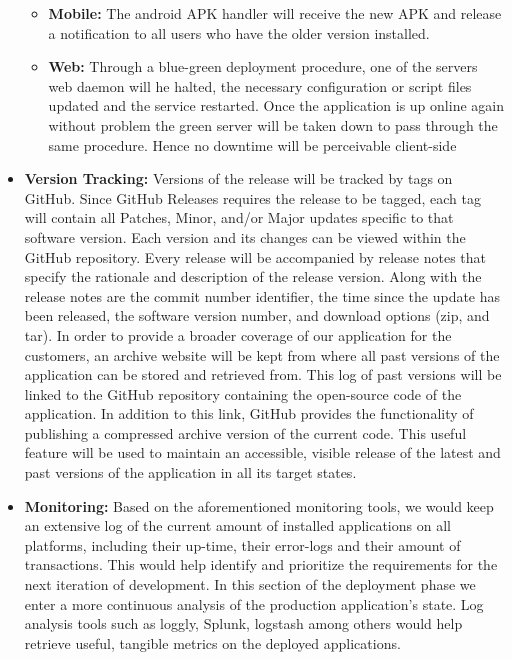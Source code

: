 \documentclass[12pt]{report}
\begin{document}
\begin{itemize}
\begin{itemize}
        \item \textbf{Mobile:} The android APK handler will receive the new APK and release a notification to all users who have the older version installed.
        \item \textbf{Web:} Through a blue-green deployment procedure, one of the servers web daemon will he halted, the necessary configuration or script files updated and the service restarted. Once the application is up online again without problem the green server will be taken down to pass through the same procedure. Hence no downtime will be perceivable client-side
    \end{itemize}
    \item \textbf{Version Tracking:} Versions of the release will be tracked by tags on GitHub.
    Since GitHub Releases requires the release to be tagged, each tag will contain all Patches, Minor, and/or Major updates specific to that software version. Each version and its changes can be viewed within the GitHub repository. Every release will be accompanied by release notes that specify the rationale and description of the release version. Along with the release notes are the commit number identifier, the time since the update has been released, the software version number, and download options (zip, and tar). In order to provide a broader coverage of our application for the customers, an archive website will be kept from where all past versions of the application can be stored and retrieved from. This log of past versions will be linked to the GitHub repository containing the open-source code of the application. In addition to this link, GitHub provides the functionality of publishing a compressed archive version of the current code. This useful feature will be used to maintain an accessible, visible release of the latest and past versions of the application in all its target states. 
    \item \textbf{Monitoring:} Based on the aforementioned monitoring tools, we would keep an extensive log of the current amount of installed applications on all platforms, including their up-time, their error-logs and their amount of transactions. This would help identify and prioritize the requirements for the next iteration of development. In this section of the deployment phase we enter a more continuous analysis of the production application's state. Log analysis tools such as loggly, Splunk, logstash among others would help retrieve useful, tangible metrics on the deployed applications.
\end{itemize}
\end{document}
